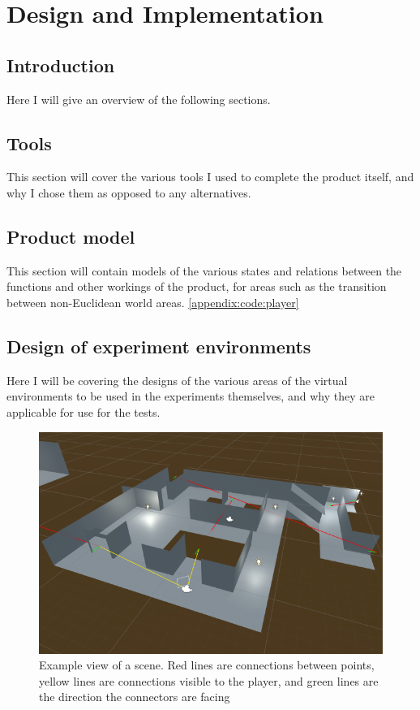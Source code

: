 \chapter[Product]{Design and Implementation}
\label{design}

\begin{multicols*}{2}

	\section{Introduction}
		Here I will give an overview of the following sections.

	\section{Tools}
		This section will cover the various tools I used to complete the product itself, and why I chose them as opposed to any alternatives.

	\section{Product model}
		This section will contain models of the various states and relations between the functions and other workings of the product, for areas such as the transition between non-Euclidean world areas.
		\autoref{appendix:code:player}

	\section{Design of experiment environments}
		Here I will be covering the designs of the various areas of the virtual environments to be used in the experiments themselves, and why they are applicable for use for the tests.

\end{multicols*}

		\begin{figure}[h]
			\label{design:fig:scene}
			\includegraphics[width=1\textwidth]{Images/Lines_Everywhere2}
			\centering
			\caption{Example view of a scene.
				Red lines are connections between points,
				yellow lines are connections visible to the player,
				and green lines are the direction the connectors are facing}
		\end{figure}

